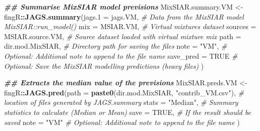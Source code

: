 \documentclass[
]{article}
\newenvironment{Shaded}{\begin{snugshade}}{\end{snugshade}}
\newcommand{\AttributeTok}[1]{\textcolor[rgb]{0.13,0.29,0.53}{#1}}
\newcommand{\CommentTok}[1]{\textcolor[rgb]{0.56,0.35,0.01}{\textit{#1}}}
\newcommand{\ConstantTok}[1]{\textcolor[rgb]{0.56,0.35,0.01}{#1}}
\newcommand{\DocumentationTok}[1]{\textcolor[rgb]{0.56,0.35,0.01}{\textbf{\textit{#1}}}}
\newcommand{\FunctionTok}[1]{\textcolor[rgb]{0.13,0.29,0.53}{\textbf{#1}}}
\newcommand{\NormalTok}[1]{#1}
\newcommand{\OtherTok}[1]{\textcolor[rgb]{0.56,0.35,0.01}{#1}}
\newcommand{\SpecialCharTok}[1]{\textcolor[rgb]{0.81,0.36,0.00}{\textbf{#1}}}
\newcommand{\StringTok}[1]{\textcolor[rgb]{0.31,0.60,0.02}{#1}}
\begin{document}
\begin{Shaded}
\begin{Highlighting}[]
\DocumentationTok{\#\# Summarise MixSIAR model previsions}
\NormalTok{MixSIAR.summary.VM }\OtherTok{\textless{}{-}}\NormalTok{ fingR}\SpecialCharTok{::}\FunctionTok{JAGS.summary}\NormalTok{(}\AttributeTok{jags.1 =}\NormalTok{ jags.VM,                            }\CommentTok{\# Data from the MixSIAR model \textasciigrave{}MixSIAR::run\_model()\textasciigrave{}}
                                          \AttributeTok{mix =}\NormalTok{ MSIAR.VM,                              }\CommentTok{\# Virtual mixtures dataset }
                                          \AttributeTok{sources =}\NormalTok{ MSIAR.source.VM,                   }\CommentTok{\# Source dataset loaded with virtual mixture mix}
                                          \AttributeTok{path =}\NormalTok{ dir.mod.MixSIAR,                      }\CommentTok{\# Directory path for saving the files}
                                          \AttributeTok{note =} \StringTok{"VM"}\NormalTok{,                                 }\CommentTok{\# Optional: Additional note to append to the file name}
                                          \AttributeTok{save\_pred =} \ConstantTok{TRUE}                             \CommentTok{\# Optional: Save the MixSIAR modelling predictions (heavy files)}
\NormalTok{                                          )}

\DocumentationTok{\#\# Extracts the median value of the previsions      }
\NormalTok{MixSIAR.preds.VM }\OtherTok{\textless{}{-}}\NormalTok{ fingR}\SpecialCharTok{::}\FunctionTok{JAGS.pred}\NormalTok{(}\AttributeTok{path =} \FunctionTok{paste0}\NormalTok{(dir.mod.MixSIAR, }\StringTok{"contrib\_VM.csv"}\NormalTok{), }\CommentTok{\# location of files generated by \textasciigrave{}JAGS.summary\textasciigrave{}}
                                     \AttributeTok{stats =} \StringTok{"Median"}\NormalTok{,                                 }\CommentTok{\# Summary statistics to calculate (Median or Mean)}
                                     \AttributeTok{save =} \ConstantTok{TRUE}\NormalTok{,                                      }\CommentTok{\# If the result should be saved}
                                     \AttributeTok{note =} \StringTok{"VM"}                                       \CommentTok{\# Optional: Additional note to append to the file name }
\NormalTok{                                     )}


\end{Highlighting}
\end{Shaded}
\end{document}
